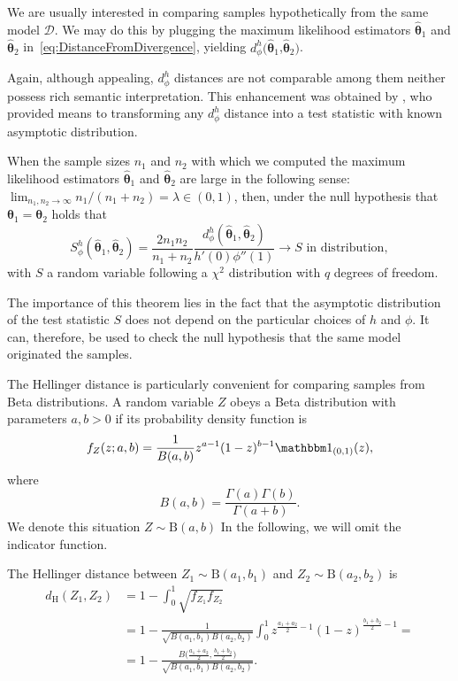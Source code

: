 \documentclass[12pt]{article}
\begin{document}
We are usually interested in comparing samples hypothetically from the same model $\mathcal D$.
We may do this by plugging the maximum likelihood estimators $\widehat{\bm\theta}_1$ and $\widehat{\bm\theta}_2$ in~\eqref{eq:DistanceFromDivergence}, yielding $d^h_\phi(\widehat{\bm\theta}_1$,$\widehat{\bm\theta}_2)$.

Again, although appealing, $d^h_\phi$ distances are not comparable among them neither possess rich semantic interpretation.
This enhancement was obtained by \cite{PAMOSAME1995}, who provided means to transforming any $d^h_\phi$ distance into a test statistic with known asymptotic distribution.

When the sample sizes $n_1$ and $n_2$ with which we computed the maximum likelihood estimators $\widehat{\bm\theta}_1$ and $\widehat{\bm\theta}_2$ are large in the following sense:
$\lim_{n_1,n_2\to\infty} n_1/(n_1+n_2)=\lambda\in(0,1)$, then, under the null hypothesis that ${\bm\theta}_1={\bm\theta}_2$ holds that
\begin{equation}
S^h_\phi (\widehat{\bm\theta}_1,\widehat{\bm\theta}_2) = 
\frac{2 n_1 n_2}{n_1 + n_2}
\frac{d^h_\phi(\widehat{\bm\theta}_1,\widehat{\bm\theta}_2)}{h'(0) \phi''(1)} \to S \text{ in distribution},
\label{eq:SStatistic}
\end{equation}
with $S$ a random variable following a $\chi^2$ distribution with $q$ degrees of freedom.

The importance of this theorem lies in the fact that the asymptotic distribution of the test statistic $S$ does not depend on the particular choices of $h$ and $\phi$.
It can, therefore, be used to check the null hypothesis that the same model originated the samples.

The Hellinger distance is particularly convenient for comparing samples from Beta distributions.
A random variable $Z$ obeys a Beta distribution with parameters $a,b>0$ if its probability density function is
$$
f_Z(z;a,b) = \frac1{B(a,b)} z^{a-1} (1-z)^{b-1} \mathbbm 1_{(0,1)}(z),
$$
where
$$
B(a,b) = \frac{\Gamma(a)\Gamma(b)}{\Gamma(a+b)}.
$$
We denote this situation $Z\sim\text{B}(a,b)$
In the following, we will omit the indicator function.

The Hellinger distance between $Z_1\sim\text{B}(a_1,b_1)$ and $Z_2\sim\text{B}(a_2,b_2)$ is
\begin{equation}
\begin{split}
d_{\text{H}}(Z_1,Z_2) & = 1-\int_{0}^{1}\sqrt{f_{Z_1} f_{Z_2}} \\
	& = 1-\frac{1}{\sqrt{B(a_1,b_1)B(a_2,b_2)}} \int_0^1 z^{\frac{a_1+a_2}{2}-1} (1-z)^{\frac{b_1+b_2}{2}-1} = \\
	& = 1- \frac{B\big(\frac{a_1+a_2}{2},\frac{b_1+b_2}{2}\big)}{\sqrt{B(a_1,b_1)B(a_2,b_2)}}.
\end{split}
\label{eq:DistHellingerBeta}
\end{equation}
\end{document}
